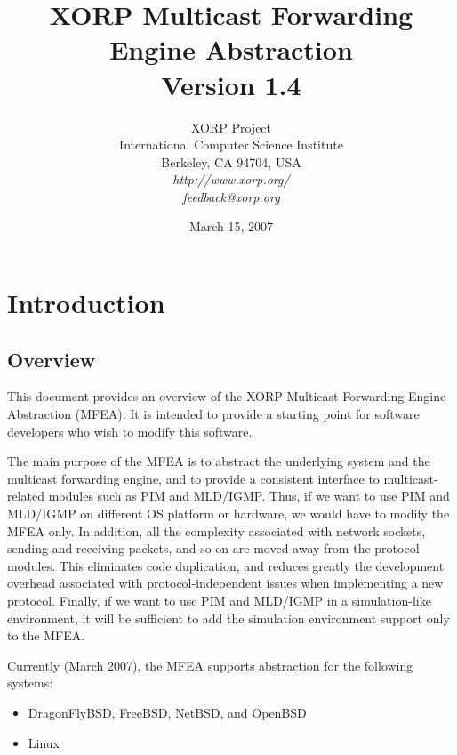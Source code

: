 \documentclass[11pt]{article}
\begin{document}
\title{XORP Multicast Forwarding Engine Abstraction \\
\vspace{1ex}
Version 1.4}
\author{ XORP Project					\\
	 International Computer Science Institute	\\
	 Berkeley, CA 94704, USA			\\
         {\it http://www.xorp.org/}			\\
	 {\it feedback@xorp.org}
}
\date{March 15, 2007}

\maketitle


\section{Introduction}


\subsection{Overview}

This document provides an overview of the XORP Multicast Forwarding
Engine Abstraction (MFEA). It is intended to provide a starting point
for software developers who wish to modify this software.

The main purpose of the MFEA is to abstract the underlying system and
the multicast forwarding engine, and to provide a consistent interface
to multicast-related modules such as PIM and MLD/IGMP. Thus, if we want
to use PIM and MLD/IGMP on different OS platform or hardware, we
would have to modify the MFEA only. In addition, all the
complexity associated with network sockets, sending and receiving
packets, and so on are moved away from the protocol modules.
This eliminates code duplication, and reduces greatly the
development overhead associated with protocol-independent
issues when implementing a new protocol. Finally, if we want to use
PIM and MLD/IGMP in a simulation-like environment, it will be sufficient
to add the simulation environment support only to the MFEA.

Currently (March 2007), the MFEA supports abstraction for
the following systems:

\begin{itemize}
  \item DragonFlyBSD, FreeBSD, NetBSD, and OpenBSD
  \item Linux
\end{itemize}
\end{document}
